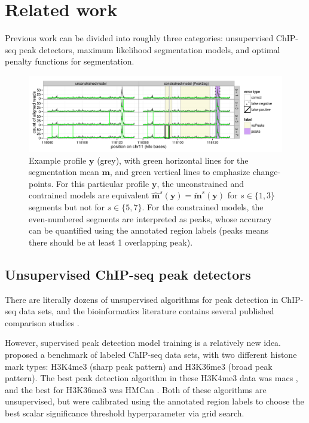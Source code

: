 \documentclass{article}
\begin{document}
\section{Related work}
\label{sec:related}

Previous work can be divided into roughly three categories:
unsupervised ChIP-seq peak detectors, maximum likelihood segmentation
models, and optimal penalty functions for segmentation.

\begin{figure}[b!]
  \centering
  \includegraphics[width=\textwidth]{figure-Segmentor-PeakSeg}
  \vskip -0.5cm
  \caption{Example profile $\mathbf y$ (grey), with green horizontal
    lines for the segmentation mean $\mathbf m$, and green vertical
    lines to emphasize change-points. For this particular profile
    $\mathbf y$, the unconstrained and contrained models are
    equivalent $\mathbf{\hat m}^s(\mathbf y) = \mathbf{\tilde
      m}^s(\mathbf y)$ for $s\in\{1, 3\}$ segments but not for
    $s\in\{5, 7\}$. For the constrained models, the even-numbered
    segments are interpreted as peaks, whose accuracy can be
    quantified using the annotated region labels
    (\textcolor{peaks}{peaks} means there should be at least 1
    overlapping peak).}
  \label{fig:Segmentor-PeakSeg}
\end{figure}

\subsection{Unsupervised ChIP-seq peak detectors}

There are literally dozens of unsupervised algorithms for peak
detection in ChIP-seq data sets, and the bioinformatics literature
contains several published comparison studies \citep{evaluation2010,
  rye2010manually, chip-seq-bench}. 

However, supervised peak detection model training is a relatively new
idea. \citet{hocking2014visual} proposed a benchmark of labeled
ChIP-seq data sets, with two different histone mark types: H3K4me3
(sharp peak pattern) and H3K36me3 (broad peak pattern). The best peak
detection algorithm in these H3K4me3 data was macs \citep{MACS}, and
the best for H3K36me3 was HMCan \citep{HMCan}. Both of these
algorithms are unsupervised, but were calibrated using the annotated
region labels to choose the best scalar significance threshold
hyperparameter via grid search.
\end{document}
